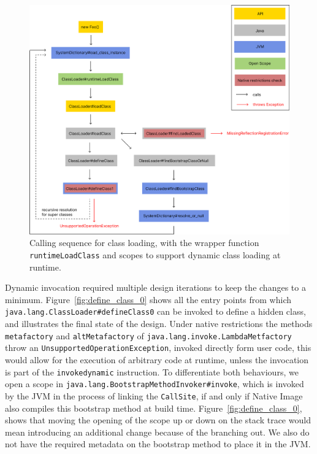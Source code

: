 \begin{figure}
    \centering
    \includegraphics[scale=0.5]{resources/Group 412.png}
    \caption{Calling sequence for class loading, with the wrapper function \texttt{runtimeLoadClass} and scopes to support dynamic class loading at runtime.}
    \label{fig:load_class}
\end{figure}

Dynamic invocation required multiple design iterations to keep the changes to a minimum. Figure~\ref{fig:define_class_0} shows all the entry points from which \verb|java.lang.ClassLoader#defineClass0| can be invoked to define a hidden class, and illustrates the final state of the design.  
Under native restrictions the methods \verb|metafactory| and \verb|altMetafactory| of \verb|java.lang.invoke.LambdaMetfactory| throw an \verb|UnsupportedOperationException|, invoked directly form user code, this would allow for the execution of arbitrary code at runtime, unless the invocation is part of the \verb|invokedynamic| instruction. To differentiate both behaviours, we open a scope in \verb|java.lang.BootstrapMethodInvoker#invoke|, which is invoked by the JVM in the process of linking the \verb|CallSite|, 
if and only if Native Image also compiles this bootstrap method at build time.
Figure~\ref{fig:define_class_0}, shows that moving the opening of the scope up or down on the stack trace would mean introducing an additional change because of the branching out. We also do not have the required metadata on the bootstrap method to place it in the JVM.

